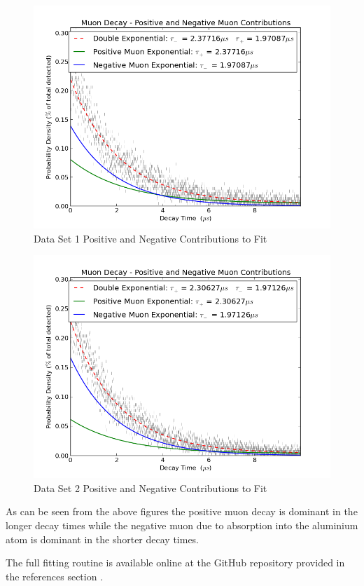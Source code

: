 \begin{figure}[H]
\begin{center}
\includegraphics[width=4 in]{graph_EPBB1_CompExp.png}
\caption{Data Set 1 Positive and Negative Contributions to Fit}
\end{center}
\end{figure}

\begin{figure}[H]
\begin{center}
\includegraphics[width=4 in]{graph_EPBB2_CompExp.png}
\caption{Data Set 2 Positive and Negative Contributions to Fit}
\end{center}
\end{figure}

As can be seen from the above figures the positive muon decay is dominant in the longer decay times while the negative muon due to absorption into the aluminium atom is dominant in the shorter decay times.  

The full fitting routine is available online at the GitHub repository provided in the references section  \cite{Fitting}.


